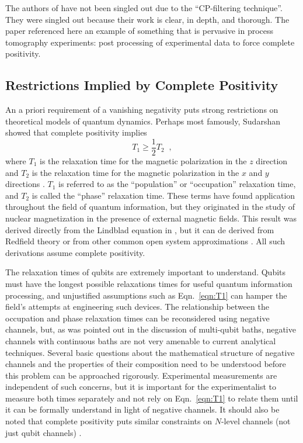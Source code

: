 The authors of \cite{Cory2004} have not been singled out due to the ``CP-filtering technique''.  They were singled out because their work is clear, in depth, and thorough.  The paper referenced here an example of something that is pervasive in process tomography experiments: post processing of experimental data to force complete positivity.  

\subsection{Restrictions Implied by Complete Positivity}

An a priori requirement of a vanishing negativity puts strong restrictions on theoretical models of quantum dynamics.  Perhaps most famously, Sudarshan \cite{Sudarshan1976} showed that complete positivity implies 
\begin{equation}
\label{eqn:T1}
T_1 \ge \frac{1}{2} T_2\;\;,
\end{equation}
where $T_1$ is the relaxation time for the magnetic polarization in the $z$ direction and $T_2$ is the relaxation time for the magnetic polarization in the $x$ and $y$ directions \cite{Sudarshan1978,Slichter1996,Bloch1946}.  $T_1$ is referred to as the ``population'' or ``occupation'' relaxation time, and $T_2$ is called the ``phase'' relaxation time.  These terms have found application throughout the field of quantum information, but they originated in the study of nuclear magnetization in the presence of external magnetic fields.  This result was derived directly from the Lindblad equation in \cite{Sudarshan1978}, but it can de derived from Redfield theory \cite{Slichter1996} or from other common open system approximations \cite{Skinner1987} \cite{Skinner1991}.  All such derivations assume complete positivity.  

The relaxation times of qubits are extremely important to understand.  Qubits must have the longest possible relaxations times for useful quantum information processing, and unjustified assumptions such as Eqn.\ \ref{eqn:T1} can hamper the field's attempts at engineering such devices.  The relationship between the occupation and phase relaxation times can be reconsidered using negative channels, but, as was pointed out in the discussion of multi-qubit baths, negative channels with continuous baths are not very amenable to current analytical techniques.  Several basic questions about the mathematical structure of negative channels and the properties of their composition need to be understood before this problem can be approached rigorously.  Experimental measurements are independent of such concerns, but it is important for the experimentalist to measure both times separately and not rely on Eqn.\ \ref{eqn:T1} to relate them until it can be formally understand in light of negative channels.  It should also be noted that complete positivity puts similar constraints on $N$-level channels (not just qubit channels) \cite{Schirmer2004}.

